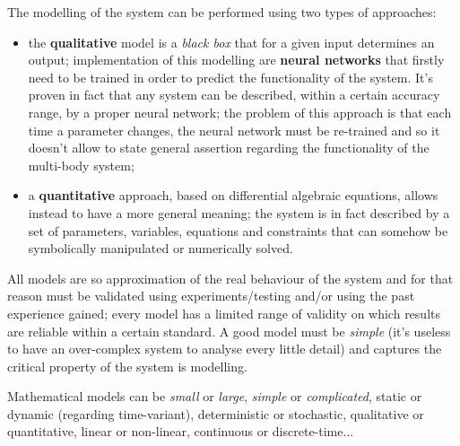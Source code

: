 	The modelling of the system can be performed using two types of approaches:
	\begin{itemize}
		\item the \textbf{qualitative} model is a \textit{black box} that for a given input determines an output; implementation of this modelling are \textbf{neural networks} that firstly need to be trained in order to predict the functionality of the system. It's proven in fact that any system can be described, within a certain accuracy range, by a proper neural network; the problem of this approach is that each time a parameter changes, the neural network must be re-trained and so it doesn't allow to state general assertion regarding the functionality of the multi-body system;
		
		\item a \textbf{quantitative} approach, based on differential algebraic equations, allows instead to have a more general meaning; the system is in fact described by a set of parameters, variables, equations and constraints that can somehow be symbolically manipulated or numerically solved.
	\end{itemize}
	
	All models are so approximation of the real behaviour of the system and for that reason must be validated using experiments/testing and/or using the past experience gained; every model has a limited range of validity on which results are reliable within a certain standard. A good model must be \textit{simple} (it's useless to have an over-complex system to analyse every little detail) and captures the critical property of the system is modelling.
	
	Mathematical models can be \textit{small} or \textit{large}, \textit{simple} or \textit{complicated}, static or dynamic (regarding time-variant), deterministic or stochastic, qualitative or quantitative, linear or non-linear, continuous or discrete-time...\\
	
